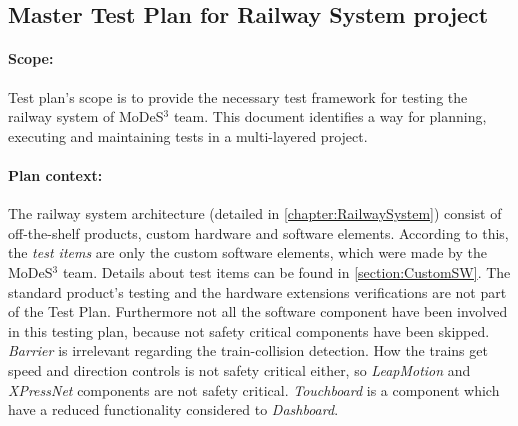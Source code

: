 \subsection{Master Test Plan for Railway System project}\label{section:MTP}
\paragraph{Scope:} Test plan's scope is to provide the necessary test framework for testing the railway system of MoDeS$^3$ team. This document identifies a way for planning, executing and maintaining tests in a multi-layered project.
\paragraph{Plan context:} The railway system architecture (detailed in \autoref{chapter:RailwaySystem}) consist of off-the-shelf products, custom hardware and software elements. According to this, the \textit{test items} are only the custom software elements, which were made by the MoDeS$^3$ team. Details about test items can be found in \autoref{section:CustomSW}. The standard product's testing and the hardware extensions verifications are not part of the Test Plan. Furthermore not all the software component have been involved in this testing plan, because not safety critical components have been skipped. \textit{Barrier} is irrelevant regarding the train-collision detection. How the trains get speed and direction controls is not safety critical either, so \textit{LeapMotion} and \textit{XPressNet} components are not safety critical. \textit{Touchboard} is a component which have a reduced functionality considered to \textit{Dashboard}.
